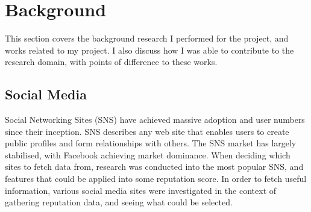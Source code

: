 \chapter{Background}\label{C:us}







This section covers the background research I performed for the project, and works related to my project. I also discuss how I was able to contribute to the research domain, with points of difference to these works. 

\section{Social Media}

Social Networking Sites (SNS) have achieved massive adoption and user numbers since their inception. SNS describes any web site that enables users to create public profiles and form relationships with others. The SNS market has largely stabilised, with Facebook achieving market dominance. When deciding which sites to fetch data from, research was conducted into the most popular SNS, and features that could be applied into some reputation score. In order to fetch useful information, various social media sites were investigated in the context of gathering reputation data, and seeing what could be selected.






